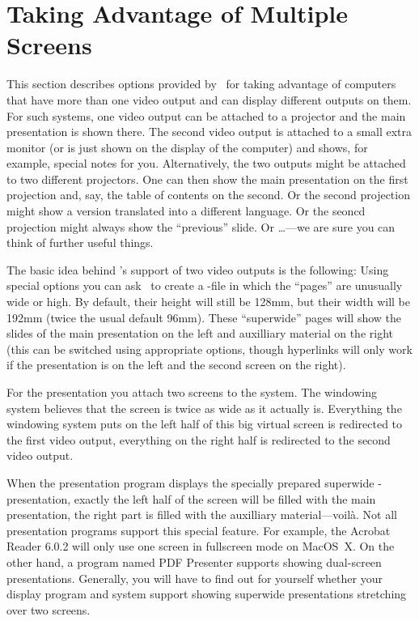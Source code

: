 %
%
%

\section{Taking Advantage of Multiple Screens}
\label{section-twoscreens}

This section describes options provided by \beamer\ for taking advantage of computers that have more than one video output and can display different outputs on them. For such systems, one video output can be attached to a projector and the main presentation is shown there. The second video output is attached to a small extra monitor (or is just shown on the display of the computer) and shows, for example, special notes for you. Alternatively, the two outputs might be attached to two different projectors. One can then show the main presentation on the first projection and, say, the table of contents on the second. Or the second projection might show a version translated into a different language. Or the seoncd projection might always show the ``previous'' slide. Or \ldots---we are sure you can think of further useful things.

The basic idea behind \beamer's support of two video outputs is the following: Using special options you can ask \beamer\ to create a \pdf-file in which the ``pages'' are unusually wide or high. By default, their height will still be 128mm, but their width will be 192mm (twice the usual default 96mm). These ``superwide'' pages will show the slides of the main presentation on the left and auxilliary material on the right (this can be switched using appropriate options, though hyperlinks will only work if the presentation is on the left and the second screen on the right).

For the presentation you attach two screens to the system. The windowing system believes that the screen is twice as wide as it actually is. Everything the windowing system puts on the left half of this big virtual screen is redirected to the first video output, everything on the right half is redirected to the second video output.

When the presentation program displays the specially prepared superwide \beamer-presentation, exactly the left half of the screen will be filled with the main presentation, the right part is filled with the auxilliary material---voil\`a. Not all presentation programs support this special feature. For example, the Acrobat Reader 6.0.2 will only use one screen in fullscreen mode on MacOS~X. On the other hand, a program named PDF Presenter supports showing dual-screen presentations. Generally, you will have to find out for yourself whether your display program and system support showing superwide presentations stretching over two screens.

